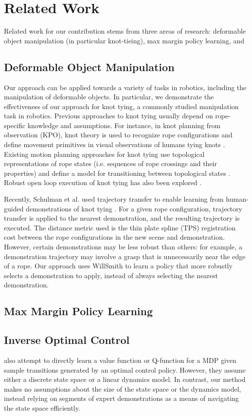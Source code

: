 \section{Related Work}
Related work for our contribution stems from three areas of research: deformable object manipulation (in particular knot-tieing), max margin policy learning, and 
\subsection{Deformable Object Manipulation}
Our approach can be applied towards a variety of tasks in robotics,
including the manipulation of deformable objects.
In particular, we demonstrate the effectiveness of our approach for
knot tying, a commonly studied manipulation task in robotics.
Previous approaches to knot tying usually depend on rope-specific knowledge
and assumptions.
For instance, in knot planning from observation (KPO), knot theory is used
to recognize rope configurations and define movement primitives in visual
observations of humans tying knots \cite{Morita_ICRA2003, Takamatsu_TransRob2006}.
Existing motion planning approaches for knot tying use topological
representations of rope states (i.e. sequences of rope crossings and their
properties) and define a model for transitioning between topological states
\cite{Saha_ExpRobotics2008, Wakamatsu_IJRR2006}.
Robust open loop execution of knot tying has also been explored \cite{Bell_PhD2010}.

Recently, Schulman et al. used trajectory transfer to enable learning
from human-guided demonstrations of knot tying \cite{Schulmanetal_ISRR2013}.
For a given rope configuration, trajectory transfer is applied to the nearest
demonstration, and the resulting trajectory is executed.
The distance metric used is the thin plate spline (TPS) registration
cost between the rope configurations in the new scene and demonstration.
However, certain demonstrations may be less robust than others: for example,
a demonstration trajectory may involve a grasp that is unnecessarily near
the edge of a rope.
Our approach uses WillSmith to learn a policy that more robustly selects a
demonstration to apply, instead of always selecting the nearest demonstration.
\subsection{Max Margin Policy Learning}

\subsection{Inverse Optimal Control}
  \citet{Dvijotham_ICML2010} also attempt
to directly learn a value function or Q-function for a MDP given sample
transitions generated by an optimal control policy. However, they assume either
a discrete state space or a linear dynamics model. In contrast, our method makes
no assumptions about the size of the state space or the dynamics model, instead
relying on segments of expert demonstrations as a means of navigating the state
space efficiently. 
